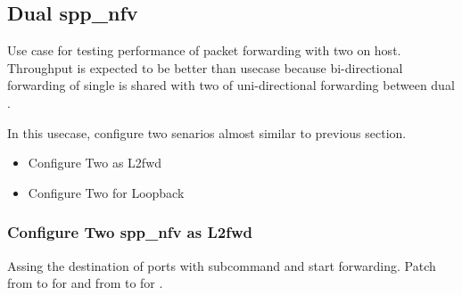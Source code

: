 \documentclass[a4paper,11pt,openany,oneside,english]{sphinxmanual}
\begin{document}
\begin{sphinxVerbatim}[commandchars=\\\{\},formatcom=\footnotesize]
\end{sphinxVerbatim}


\subsection{Dual spp\_nfv}
\label{\detokenize{usecases/spp_nfv:dual-spp-nfv}}
Use case for testing performance of packet forwarding
with two  on host.
Throughput is expected to be better than
{\hyperref[\detokenize{usecases/spp_nfv:spp-usecases-nfv-single-spp-nfv}]{}}
usecase because bi-directional forwarding of single  is shared
with two of uni-directional forwarding between dual .

In this usecase, configure two senarios almost similar to previous section.
\begin{itemize}
\item {} 
Configure Two  as L2fwd

\item {} 
Configure Two  for Loopback

\end{itemize}


\subsubsection{Configure Two spp\_nfv as L2fwd}
\label{\detokenize{usecases/spp_nfv:configure-two-spp-nfv-as-l2fwd}}
Assing the destination of ports with  subcommand and
start forwarding.
Patch from  to  for  and
from  to  for .

\begin{sphinxVerbatim}[commandchars=\\\{\},formatcom=\footnotesize]
\end{sphinxVerbatim}
\end{document}
